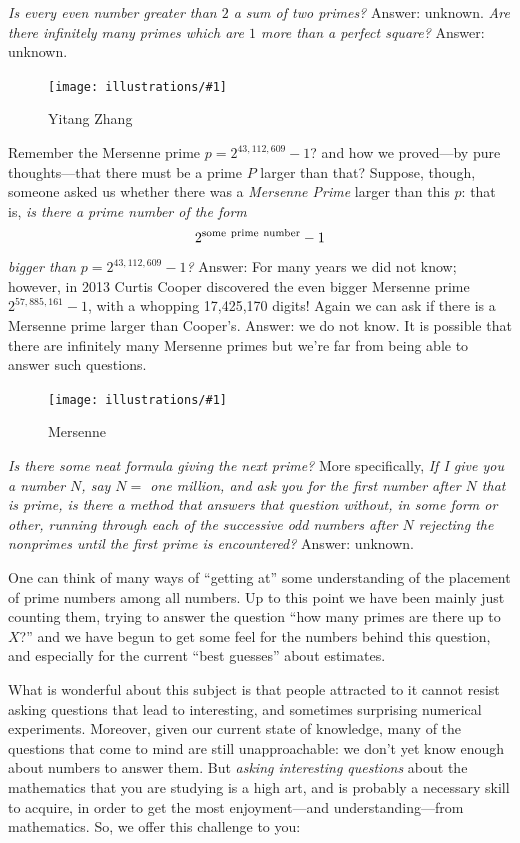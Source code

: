 \documentclass[openany]{book}
\newcommand{\ill}[3]{%
   \begin{figure}[H]%
   \vspace{-2ex}
   \centering%
   \texttt{[image: illustrations/\#1]}%
   \caption{#3}%
   \vspace{-2ex}
    \end{figure}}
\theoremstyle{plain}
\theoremstyle{definition}
\begin{document}
{\em Is every even number greater than $2$ a sum of
  two primes?}  Answer: unknown. {\em Are there infinitely many primes
  which are $1$ more than a perfect square?}  Answer: unknown.

\ill{zhang}{0.25}{Yitang Zhang\label{fig:zhang}}



Remember the Mersenne prime $p= 2^{43,112,609}-1$? and how we
proved---by pure thoughts---that there must be
a prime $P$ larger than that? Suppose, though, someone
asked us whether there was a {\it Mersenne Prime} larger than this
$p$: that is, {\em is there a prime number of the form $$2^{\rm some\
  prime\ number}-1$$ bigger than $p= 2^{43,112,609}-1$?} Answer:
For many years we did not know; however, in 2013 Curtis Cooper discovered
the even bigger Mersenne prime $2^{57,885,161}-1$, with a whopping
17,425,170 digits!  Again we can ask if there is a Mersenne
prime larger than Cooper's.  Answer: we do not know.
It is possible that there are infinitely many Mersenne primes
but we're far from being able to answer such questions.

\ill{mersenne}{.3}{Mersenne}



{\em Is there some neat formula giving the next prime?} More
specifically, {\em If I give you a number $N$, say $N=$ one million,
  and ask you for the first number after $N$ that is prime, is there a
  method that answers that question without, in some form or other,
  running through each of the successive odd numbers after $N$ rejecting
  the nonprimes until the first prime is encountered?}  Answer:
unknown.



One can think of many ways of ``getting at'' some understanding of the
placement of prime numbers among all numbers.  Up to this point we have
been mainly just counting them, trying to answer the question ``how
many primes are there up to $X$?''  and we have begun to get some feel
for the numbers behind this question, and especially for the current
``best guesses'' about estimates.


What is wonderful about this subject is that people attracted to it
cannot resist asking questions that lead to interesting, and sometimes
surprising numerical experiments. Moreover, given our current state of
knowledge, many of the questions that come to mind are still
unapproachable: we don't yet know enough about numbers to answer them.
But {\it asking interesting questions} about the mathematics that you
are studying is a high art, and is probably a necessary skill to
acquire, in order to get the most enjoyment---and understanding---from
mathematics.  So, we offer this challenge to you:
\end{document}
